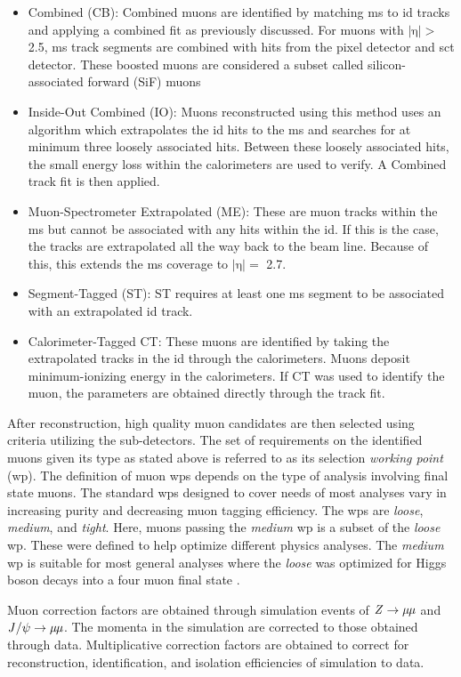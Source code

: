 \begin{itemize}
    \item Combined (CB): Combined muons are identified by matching \gls{ms} to \gls{id} tracks and applying a combined fit as previously discussed. For muons with 
    $|\textrm{η}| >$ 2.5, \gls{ms} track segments are combined with hits from the pixel detector and \gls{sct} detector. These boosted muons are considered a subset called 
    silicon-associated forward (SiF) muons
    \item Inside-Out Combined (IO): Muons reconstructed using this method uses an algorithm which extrapolates the \gls{id} hits to the \gls{ms} and searches for at minimum three
    loosely associated hits. Between these loosely associated hits, the small energy loss within the calorimeters are used to verify. A Combined track fit is then applied.
    \item Muon-Spectrometer Extrapolated (ME): These are muon tracks within the \gls{ms} but cannot be associated with any hits within the \gls{id}. If this is the case, the tracks
    are extrapolated all the way back to the beam line. Because of this, this extends the \gls{ms} coverage to $|\textrm{η}| =$ 2.7.  
    \item Segment-Tagged (ST): ST requires at least one \gls{ms} segment to be associated with an extrapolated \gls{id} track. 
    \item Calorimeter-Tagged {CT}: These muons are identified by taking the extrapolated tracks in the \gls{id} through the calorimeters. Muons deposit minimum-ionizing 
    energy in the calorimeters. If CT was used to identify the muon, the parameters are obtained directly through the track fit. 
\end{itemize}

After reconstruction, high quality muon candidates are then selected using criteria utilizing the sub-detectors. The set of requirements on the identified muons given its type as 
stated above is referred to as its selection \textit{working point} (\gls{wp}). The definition of muon \gls{wp}s depends on the type of analysis involving final state muons. 
The standard \gls{wp}s designed to cover needs of most analyses vary in increasing purity and decreasing muon tagging efficiency. The \gls{wp}s are \textit{loose}, \textit{medium},
and \textit{tight}. Here, muons passing the \textit{medium} \gls{wp} is a subset of the \textit{loose} \gls{wp}. These were defined to help optimize different physics analyses. 
The \textit{medium} \gls{wp} is suitable for most general analyses where the \textit{loose} was optimized for Higgs boson decays into a four muon final state \cite{muon-reco}.
\par
Muon correction factors are obtained through simulation events of $\textrm{\textit{Z}} \rightarrow \textrm{\textit{µµ}}$ and $\textrm{\textit{J}}/\psi \rightarrow \textrm{\textit{µµ}}$. The momenta
in the simulation are corrected to those obtained through data. Multiplicative correction factors are obtained to correct for reconstruction, identification, and isolation 
efficiencies of simulation to data. 

